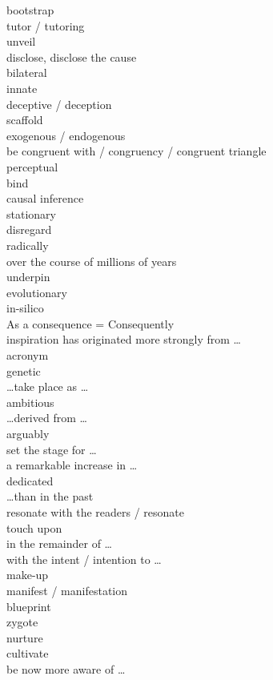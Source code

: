 \documentclass[12pt]{article}
\begin{document}
bootstrap \\
tutor / tutoring \\
unveil \\
disclose, disclose the cause \\
bilateral \\
innate \\
deceptive / deception \\
scaffold \\
exogenous / endogenous \\
be congruent with / congruency / congruent triangle \\
perceptual \\
bind \\
causal inference \\
stationary \\
disregard \\
radically \\
over the course of millions of years \\
underpin \\
evolutionary \\
in-silico \\
As a consequence = Consequently \\
inspiration has originated more strongly from \dots \\
acronym \\
genetic \\
\dots take place as \dots \\
ambitious \\
\dots derived from \dots \\
arguably \\
set the stage for \dots \\
a remarkable increase in \dots \\
dedicated \\
\dots than in the past \\
resonate with the readers / resonate \\
touch upon \\
in the remainder of \dots \\
with the intent / intention to \dots \\
make-up \\
manifest / manifestation \\
blueprint \\
zygote \\
nurture \\
cultivate \\
be now more aware of \dots \\
\end{document}
